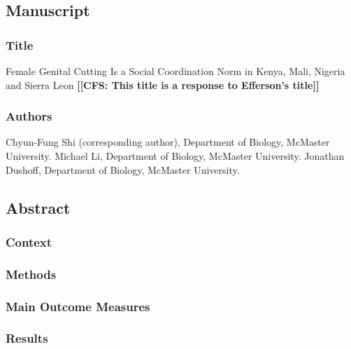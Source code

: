 \documentclass[12pt,]{article}
\date{}
\newcommand{\comment}[1]{\textbf{[[#1]]}}
\newcommand{\cfcmt}[1]{\comment{CFS: #1}}
\begin{document}
\subsection{Manuscript}\label{manuscript}

\subsubsection{Title}\label{title}

Female Genital Cutting Is a Social Coordination Norm in Kenya, Mali, Nigeria and Sierra Leon
\cfcmt{This title is a response to Efferson’s title}

\subsubsection{Authors}\label{authors}

Chyun-Fung Shi (corresponding author), Department of Biology, McMaster
University. Michael Li, Department of Biology, McMaster University.
Jonathan Dushoff, Department of Biology, McMaster
University.

\subsection{Abstract}\label{abstract}

\subsubsection{Context}\label{context}

\subsubsection{}\label{objective}

\subsubsection{Methods}\label{Methods}

\subsubsection{Main Outcome Measures}\label{main-outcome-measures}

\subsubsection{Results}\label{results}
\end{document}
